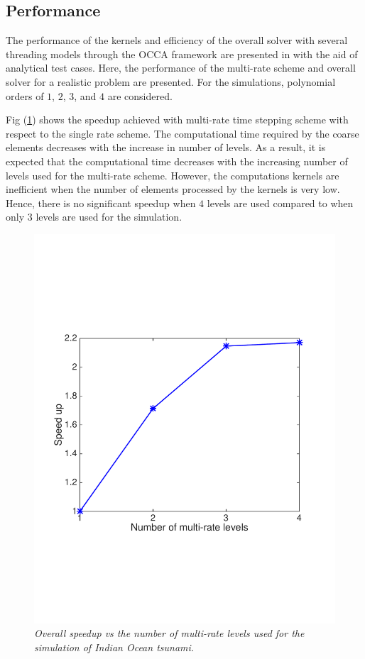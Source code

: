 \subsection{Performance}
The performance of the kernels and efficiency of the overall solver with several threading models through the OCCA framework are presented in \cite{gandham2014swe} with the aid of analytical test cases. Here, the performance of the multi-rate scheme and overall solver for a realistic problem are presented. For the simulations, polynomial orders of $1$, $2$, $3$, and $4$ are considered.

Fig (\ref{fig:timeVsLevels}) shows the speedup achieved with multi-rate time stepping scheme with respect to the single rate scheme. The computational time required by the coarse elements decreases with the increase in number of levels. As a result, it is expected that the computational time decreases with the increasing number of levels used for the multi-rate scheme. However, the computations kernels are inefficient when the number of elements processed by the kernels is very low. Hence, there is no significant speedup when $4$ levels are used compared to when only $3$ levels are used for the simulation.  
\begin{figure}[h!]
\begin{center}
\includegraphics[trim=1cm 6cm 2cm 7cm,clip=true,width=0.5\linewidth]{./figures/timeVsLevels.pdf}
\caption{\emph{Overall speedup vs the number of multi-rate levels used for the simulation of Indian Ocean tsunami.}}
\label{fig:timeVsLevels}
\end{center}
\end{figure}

